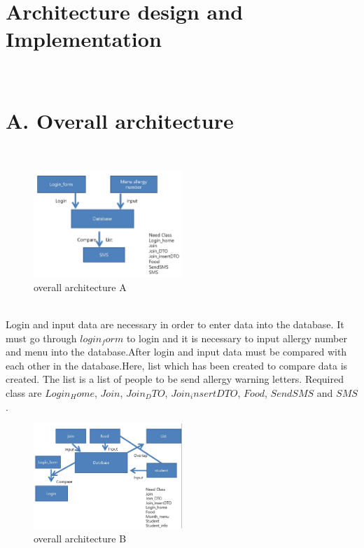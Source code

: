 \documentclass[a4paper,11pt]{IEEEtran}
\begin{document}
{\large
\section{Architecture design and Implementation}
~\\
\section*{A. Overall architecture}
~\\
\begin{figure}[!h]
        \centering
        \includegraphics[width=0.5\textwidth, height=0.5\textheight]{oa1.jpg}
        \caption{overall architecture A}
        \label{fig1}
\end{figure}
~\\
Login and input data are necessary in order to enter data into the database. It must go through $login_form$ to login and it is necessary to input allergy number and menu into the database.After login and input data must be compared with each other in the database.Here, list which has been created to compare data is created. The list is a list of people to be send allergy warning letters. Required class are $Login_Home$, $Join$, $Join_DTO$, $Join_insertDTO$, $Food$, $SendSMS$ and $SMS$.
~\\
\begin{figure}[!h]
        \centering
        \includegraphics[width=0.5\textwidth, height=0.5\textheight]{oa2.jpg}
        \caption{overall architecture B}
        \label{fig1}
\end{figure}
~\\
}
\end{document}

